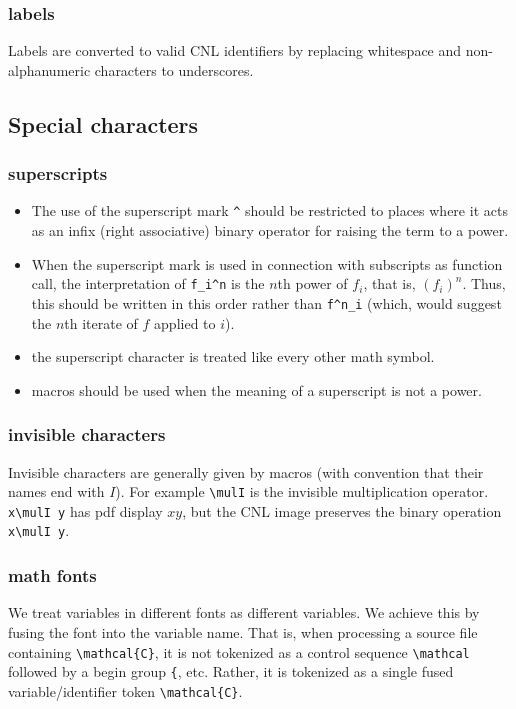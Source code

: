 \documentclass[12pt]{amsart}
\begin{document}
\subsubsection{labels}

Labels are converted to valid CNL identifiers by replacing
whitespace and non-alphanumeric characters to underscores.

\subsection{Special characters}

\subsubsection{superscripts}

\begin{itemize}
\item The use of the superscript mark \verb!^! should be restricted
to places where it acts as an infix (right associative) binary
operator for raising the term to a power.
\item When the superscript mark is used in connection with
subscripts as function call, the interpretation of \verb!f_i^n! is
the $n$th power of $f_i$, that is, $(f_i)^n$. 
Thus, this should be written in this
order rather than \verb!f^n_i! (which, would suggest the $n$th iterate
of $f$ applied to $i$).
\item the superscript character is treated like every other math symbol.
\item macros should be used when the meaning of a superscript is
not a power.
\end{itemize}

\subsubsection{invisible characters}

Invisible characters are generally given by macros
(with convention that their names end with $I$).  For example
\verb!\mulI! is the invisible multiplication operator.
\verb!x\mulI y! has pdf display $x y$, but the CNL image
preserves the binary operation \verb!x\mulI y!.

\subsubsection{math fonts} 

We treat variables in different fonts as different variables.  We achieve this by fusing the font into the variable name.
That is, when processing a source file containing \verb!\mathcal{C}!, it is not tokenized as a control sequence \verb!\mathcal! followed by
a begin group \verb!{!, etc.  Rather, it is tokenized as a single fused variable/identifier token \verb!\mathcal{C}!.
\end{document}
